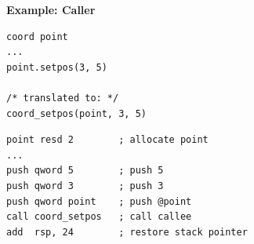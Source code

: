 \documentclass[twocolumn,english]{article}
\begin{document}
\begin{table}[H]
\textbf{Example: Caller}

\noindent \begin{minipage}[t]{0.2\textwidth}
\begin{lstlisting}[basicstyle={\scriptsize\ttfamily},breaklines=true,keywords={loop, exit, when, end}]
coord point
...
point.setpos(3, 5)

/* translated to: */
coord_setpos(point, 3, 5)
\end{lstlisting}


\noindent \end{minipage}
\begin{minipage}[t]{0.3\textwidth}

\noindent \begin{centering}
\begin{lstlisting}[basicstyle={\scriptsize\ttfamily},breaklines=true,keywords={loop, exit, when, end}]
point resd 2        ; allocate point
...
push qword 5        ; push 5
push qword 3        ; push 3
push qword point    ; push @point
call coord_setpos   ; call callee
add  rsp, 24        ; restore stack pointer
\end{lstlisting}

\par\end{centering}

\noindent \centering{}\end{minipage}
\end{table}
\end{document}
